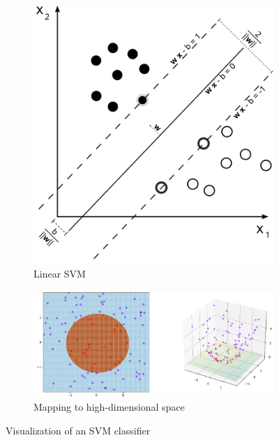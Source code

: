 \documentclass[conference,compsoc]{IEEEtran}
\begin{document}
\begin{figure}[h]
        \begin{subfigure}{0.16\textwidth}
                \includegraphics[width=\textwidth]{svm.png}
	     \caption{Linear SVM}
	     \label{fig:lsvm}
        \end{subfigure}
        \begin{subfigure}{0.32\textwidth}
                \includegraphics[width=\textwidth]{ktrick.png}
	     \caption{Mapping to high-dimensional space}
	     \label{fig:ktrick}
        \end{subfigure}
	\caption{Visualization of an SVM classifier}
	\label{fig:svm}
\end{figure}
\end{document}
